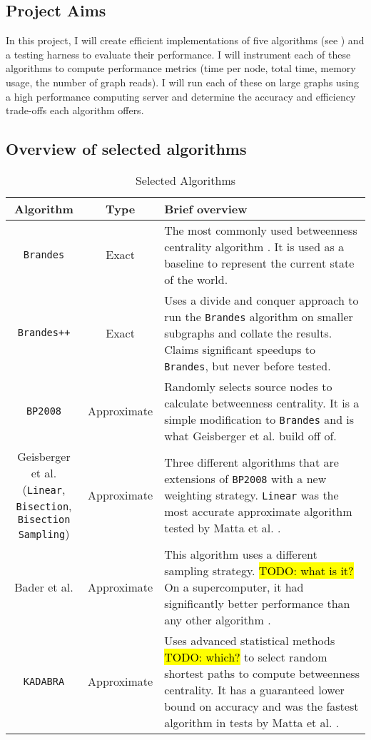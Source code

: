 \documentclass[a4paper,12pt]{article}
\makeatletter
\newcommand{\specialcell}[2][c]{%
  \begin{tabular}[#1]{@{}c@{}}#2\end{tabular}}
\makeatother
\begin{document}
\subsection{Project Aims}

In this project, I will create efficient implementations of five algorithms (see ) and a testing harness to evaluate their performance. I will instrument each of these algorithms to compute performance metrics (time per node, total time, memory usage, the number of graph reads). I will run each of these on large graphs using a high performance computing server and determine the accuracy and efficiency trade-offs each algorithm offers.

\subsection{Overview of selected algorithms}
\begin{table}[H]
\label{tab:algorithms}

\renewcommand\arraystretch{1.5}
    \centering
    \caption{Selected Algorithms}
\begin{tabularx}{\linewidth}{|c|c|X|}
\hline 
\textbf{Algorithm} & \textbf{Type} & \textbf{Brief overview} \\ 
\hline 
\texttt{Brandes} \cite{brandes} & Exact & The most commonly used betweenness centrality algorithm \cite{erdos}. It is used as a baseline to represent the current state of the world.\\ 
\hline 
\texttt{Brandes++} \cite{erdos}& Exact & Uses a divide and conquer approach to run the \texttt{Brandes} algorithm on smaller subgraphs and collate the results. Claims significant speedups to \texttt{Brandes}, but never before tested.\\ 
\hline  
\texttt{BP2008} \cite{brandes2008} & Approximate & Randomly selects source nodes to calculate betweenness centrality. It is a simple modification to \texttt{Brandes} and is what Geisberger et al. build off of.\\
\hline 
\specialcell{Geisberger et al. \cite{geisberger} \\ (\texttt{Linear}, \texttt{Bisection},\\ \texttt{Bisection Sampling})} & Approximate & Three different algorithms that are extensions of \texttt{BP2008} with a new weighting strategy.
\texttt{Linear} was the most accurate approximate algorithm tested by Matta et al. \cite{comparesmall}.\\ 
\hline 
Bader et al. \cite{bader} & Approximate & This algorithm uses a different sampling strategy. \hl{TODO: what is it?} On a supercomputer, it had significantly better performance than any other algorithm \cite{comparebig}.\\ 
\hline 
\texttt{KADABRA} \cite{borassi}& Approximate & Uses advanced statistical methods \hl{TODO: which?} to select random shortest paths to compute betweenness centrality. It has a guaranteed lower bound on accuracy and was the fastest algorithm in tests by Matta et al. \cite{comparesmall}.\\ 
\hline 
\end{tabularx}
\end{table}
\end{document}
